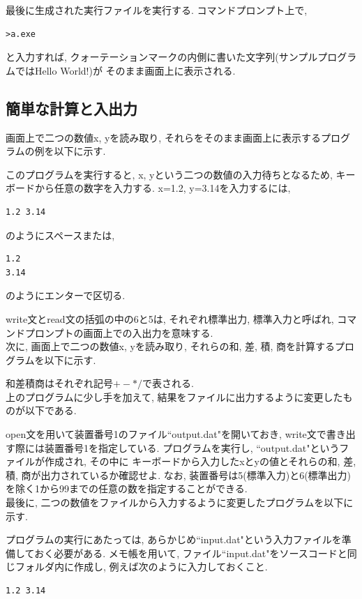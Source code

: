 \documentclass[a4j]{jsarticle}
\begin{document}
最後に生成された実行ファイルを実行する. コマンドプロンプト上で, 
\begin{Verbatim}[frame=single]
>a.exe
\end{Verbatim}
と入力すれば, クォーテーションマークの内側に書いた文字列(サンプルプログラムではHello World!)が
そのまま画面上に表示される. 

\subsection{簡単な計算と入出力}
画面上で二つの数値x, yを読み取り, それらをそのまま画面上に表示するプログラムの例を以下に示す. 

このプログラムを実行すると, x, yという二つの数値の入力待ちとなるため, 
キーボードから任意の数字を入力する. 
x=1.2, y=3.14を入力するには, 
\begin{Verbatim}[frame=single]
1.2 3.14
\end{Verbatim}
のようにスペースまたは, 
\begin{Verbatim}[frame=single]
1.2
3.14
\end{Verbatim}
のようにエンターで区切る. 

write文とread文の括弧の中の6と5は, 
それぞれ標準出力, 標準入力と呼ばれ, コマンドプロンプトの画面上での入出力を意味する. \\


次に, 画面上で二つの数値x, yを読み取り, それらの和, 差, 積, 商を計算するプログラムを以下に示す.  

和差積商はそれぞれ記号$+-*/$で表される. 
\\

上のプログラムに少し手を加えて, 結果をファイルに出力するように変更したものが以下である. 

open文を用いて装置番号1のファイル``output.dat"を開いておき, 
write文で書き出す際には装置番号1を指定している. 
プログラムを実行し, ``output.dat"というファイルが作成され, その中に
キーボードから入力したxとyの値とそれらの和, 差, 積, 商が出力されているか確認せよ. 
なお, 装置番号は5(標準入力)と6(標準出力)を除く1から99までの任意の数を指定することができる. \\

最後に, 二つの数値をファイルから入力するように変更したプログラムを以下に示す. 

プログラムの実行にあたっては, あらかじめ``input.dat"という入力ファイルを準備しておく必要がある. 
メモ帳を用いて, ファイル``input.dat"をソースコードと同じフォルダ内に作成し, 例えば次のように入力しておくこと. 
\begin{Verbatim}[frame=single]
1.2 3.14
\end{Verbatim}
\end{document}
